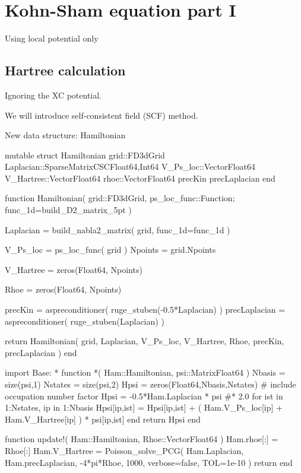 \chapter{Kohn-Sham equation part I}

Using local potential only

\section{Hartree calculation}

Ignoring the XC potential.

We will introduce self-consistent field (SCF) method.

New data structure: Hamiltonian

\begin{juliacode}
mutable struct Hamiltonian
  grid::FD3dGrid
  Laplacian::SparseMatrixCSC{Float64,Int64}
  V_Ps_loc::Vector{Float64}
  V_Hartree::Vector{Float64}
  rhoe::Vector{Float64}
  precKin
  precLaplacian
end
\end{juliacode}

\begin{juliacode}
function Hamiltonian( grid::FD3dGrid, ps_loc_func::Function; func_1d=build_D2_matrix_5pt )
    
  Laplacian = build_nabla2_matrix( grid, func_1d=func_1d )
    
  V_Ps_loc = ps_loc_func( grid )
  Npoints = grid.Npoints
    
  V_Hartree = zeros(Float64, Npoints)

  Rhoe = zeros(Float64, Npoints)

  precKin = aspreconditioner( ruge_stuben(-0.5*Laplacian) )
  precLaplacian = aspreconditioner( ruge_stuben(Laplacian) )
    
  return Hamiltonian( grid, Laplacian, V_Ps_loc, V_Hartree, Rhoe, precKin, precLaplacian )
end
\end{juliacode}


\begin{juliacode}
import Base: *
function *( Ham::Hamiltonian, psi::Matrix{Float64} )
  Nbasis = size(psi,1)
  Nstates = size(psi,2)
  Hpsi = zeros(Float64,Nbasis,Nstates)
  # include occupation number factor
  Hpsi = -0.5*Ham.Laplacian * psi #* 2.0
  for ist in 1:Nstates, ip in 1:Nbasis
    Hpsi[ip,ist] = Hpsi[ip,ist] + ( Ham.V_Ps_loc[ip] + Ham.V_Hartree[ip] ) * psi[ip,ist]
  end
  return Hpsi
end
\end{juliacode}

\begin{juliacode}
function update!( Ham::Hamiltonian, Rhoe::Vector{Float64} )
  Ham.rhoe[:] = Rhoe[:]
  Ham.V_Hartree = Poisson_solve_PCG(
      Ham.Laplacian, Ham.precLaplacian, -4*pi*Rhoe, 1000,
      verbose=false, TOL=1e-10
  )
  return
end
\end{juliacode}

